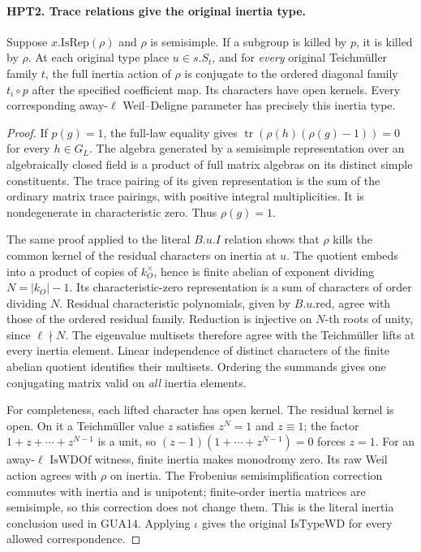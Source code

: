 \documentclass[11pt,a4paper]{article}
\numberwithin{equation}{section}
\theoremstyle{remark}\newtheorem{remark}[theorem]{Remark}
\begin{document}
\paragraph{HPT2. Trace relations give the original inertia type.}
\label{claim:HPT2}
Suppose $x.\mathrm{IsRep}(\rho)$ and $\rho$ is semisimple.  If a
subgroup is killed by $p$, it is killed by $\rho$.  At each original
type place $u\in s.S_t$, and for \emph{every} original Teichm\"uller
family $t$, the full inertia action of $\rho$ is conjugate to the
ordered diagonal family $t_i\circ p$ after the specified coefficient
map.  Its characters have open kernels.  Every corresponding
away-$\ell$ Weil--Deligne parameter has precisely this inertia type.
\begin{proof}
If $p(g)=1$, the full-law equality gives
$\operatorname{tr}(\rho(h)(\rho(g)-1))=0$ for every $h\in G_L$.
The algebra generated by a semisimple representation over an
algebraically closed field is a product of full matrix algebras on
its distinct simple constituents.  The trace pairing of its given
representation is the sum of the ordinary matrix trace pairings,
with positive integral multiplicities.  It is nondegenerate in
characteristic zero.  Thus $\rho(g)=1$.

The same proof applied to the literal $B.u.I$ relation shows that
$\rho$ kills the common kernel of the residual characters on
inertia at $u$.  The quotient embeds into a product of copies of
$k_O^\times$, hence is finite abelian of exponent dividing
$N=|k_O|-1$.  Its characteristic-zero representation is a sum of
characters of order dividing $N$.  Residual characteristic
polynomials, given by $B.u.\mathrm{red}$, agree with those of the
ordered residual family.  Reduction is injective on $N$-th roots
of unity, since $\ell\nmid N$.  The eigenvalue multisets therefore
agree with the Teichm\"uller lifts at every inertia element.
Linear independence of distinct characters of the finite abelian
quotient identifies their multisets.  Ordering the summands gives
one conjugating matrix valid on \emph{all} inertia elements.

For completeness, each lifted character has open kernel.  The
residual kernel is open.  On it a Teichm\"uller value $z$ satisfies
$z^N=1$ and $z\equiv1$; the factor $1+z+\cdots+z^{N-1}$ is a unit,
so $(z-1)(1+\cdots+z^{N-1})=0$ forces $z=1$.
For an away-$\ell$ $\mathrm{IsWDOf}$ witness, finite inertia makes
monodromy zero.  Its raw Weil action agrees with $\rho$ on inertia.
The Frobenius semisimplification correction commutes with inertia
and is unipotent; finite-order inertia matrices are semisimple,
so this correction does not change them.  This is the literal
inertia conclusion used in GUA14.  Applying $\iota$ gives the
original $\mathrm{IsTypeWD}$ for every allowed correspondence.
\end{proof}
\end{document}
